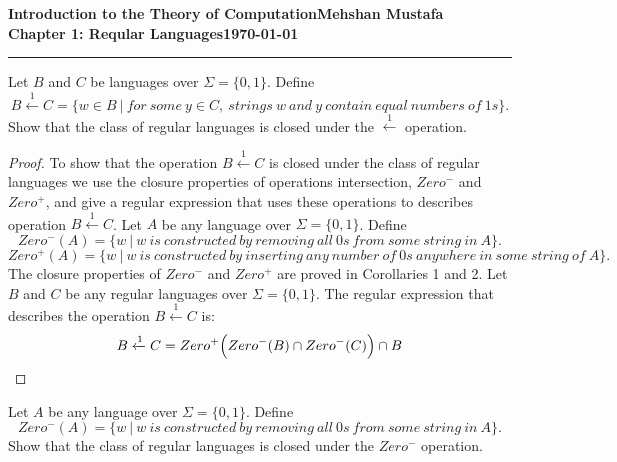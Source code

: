 \documentclass[11pt]{article}
\newcommand{\myname}{Mehshan Mustafa}
\newcommand{\dated}{\today}
\newenvironment{problem}[2][Problem]{\begin{trivlist}
\item[\hskip \labelsep {\bfseries #1}\hskip \labelsep {\bfseries #2.}]}{\end{trivlist}}
\newenvironment{corollary}[2][Corollary]{\begin{trivlist}
\item[\hskip \labelsep {\bfseries #1}\hskip \labelsep {\bfseries #2.}]}{\end{trivlist}}
\begin{document}
\textbf{Introduction to the Theory of
Computation}\hfill\textbf{\myname}\\[0.01in]
\textbf{Chapter 1: Reqular Languages}\hfill\textbf{\dated}\\
\smallskip\hrule\bigskip

\begin{problem}{1.41}
Let $B$ and $C$ be languages over $\Sigma = \{0, 1\}$. Define
\[
B \xleftarrow{1} C = \{ w \in B \ |  \ for \ some \ y \in C, \ strings \ w \ and \ y \ contain \ equal \ numbers \ of \ 1s \}.
\]
Show that the class of regular languages is closed under the $\xleftarrow{1}$ operation.
\end{problem}

\begin{proof}
To show that the operation $B \xleftarrow{1} C$ is closed under the class of regular languages we use the closure properties of operations intersection, $Zero^{-}$ and $Zero^{+}$, and give a regular expression that uses these operations to describes  operation $B \xleftarrow{1} C$. Let $A$ be any language over $\Sigma = \{0, 1\}$. Define
\[
Zero^{-}(A) = \{ w \ | \ w \ is \ constructed \ by \ removing \ all \ 0s \ from \ some \ string \ in \ A \}. 
\]
\[
Zero^{+}(A) = \{ w \ | \ w \ is \ constructed \ by \ inserting \ any \ number \ of \ 0s \ anywhere \ in \ some \ string \ of \ A \}.
\]
The closure properties of $Zero^{-}$ and $Zero^{+}$ are proved in Corollaries 1 and 2. Let $B$ and $C$ be any regular languages over $\Sigma = \{0, 1\}$. The regular expression that describes the operation $B \xleftarrow{1} C$ is:
\[
B \xleftarrow{1} C = Zero^{+} \Bigl( Zero^{-}(B) \cap Zero^{-}(C) \Bigr) \cap B
\]
\end{proof}

\begin{corollary}{1}
Let $A$ be any language over $\Sigma = \{0, 1\}$. Define
\[
Zero^{-}(A) = \{ w \ | \ w \ is \ constructed \ by \ removing \ all \ 0s \ from \ some \ string \ in \ A \}.
\]
Show that the class of regular languages is closed under the $Zero^{-}$ operation.
\end{corollary}
\end{document}
